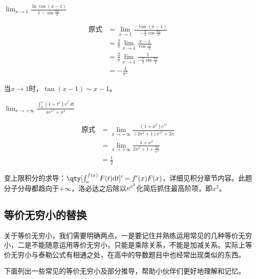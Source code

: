 \begin{example}
	$\lim_{x \to 1}\frac{\ln \cos(x-1)}{1-\sin \frac{\pi x}{2}}$
	\begin{solution}
		\begin{align*}
			\text{原式} & =\lim_{x \to 1}\frac{-\tan (x-1)}{-\frac{\pi}{2}\cos \frac{\pi x}{2}}     \\
			            & =\frac{2}{\pi}\lim_{x \to 1}\frac{x-1}{\cos \frac{\pi x}{2}}              \\
			            & =\frac{2}{\pi}\lim_{x \to 1}\frac{1}{-\frac{\pi}{2} \sin \frac{\pi x}{2}} \\
			            & =-\frac{4}{\pi^2}
		\end{align*}
	\end{solution}
\end{example}
\begin{remark}
	当$x \to 1$时，$\tan(x-1)\sim x-1$。
\end{remark}
\begin{example}
	$\lim_{x \to +\infty}\frac{\int_{0}^{x}(1+t^2)e^{t^2}dt}{xe^{x^2}+x^2}$
	\begin{solution}
		\begin{align*}
			\text{原式} & =\lim_{x \to +\infty}\frac{(1+x^2)e^{x^2}}{(2x^2+1)e^{x^2}+2x} \\
			            & =\lim_{x \to +\infty}\frac{1+x^2}{2x^2+1+\frac{2x}{e^{x^2}}}   \\
			            & =\frac{1}{2}
		\end{align*}
	\end{solution}
\end{example}
\begin{remark}
	变上限积分的求导：$\qty[\int_{a}^{f(x)}F(t){\rm d}t]' = f'(x)F(x)$，详细见积分章节内容。此题分子分母都趋向于$+\infty$，洛必达之后除以${\rm e}^{x^2}$化简后抓住最高阶项，即$x^2$。
\end{remark}

\subsection{等价无穷小的替换}
关于等价无穷小，我们需要明确两点，一是要记住并熟练运用常见的几种等价无穷小，二是不能随意运用等价无穷小，只能是乘除关系，不能是加减关系。实际上等价无穷小与泰勒公式有相通之处，在高中的导数题目中也经常出现类似的东西。

下面列出一些常见的等价无穷小及部分推导，帮助小伙伴们更好地理解和记忆。

